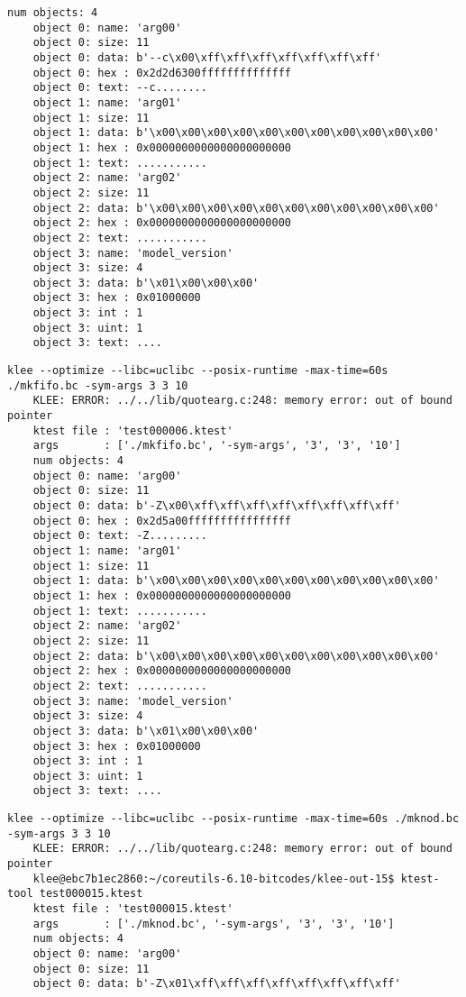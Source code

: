 \documentclass[12pt,letterpaper]{article}
\begin{document}
\begin{mdframed}
\begin{lstlisting}[basicstyle=\tiny]
    num objects: 4
    object 0: name: 'arg00'
    object 0: size: 11
    object 0: data: b'--c\x00\xff\xff\xff\xff\xff\xff\xff'
    object 0: hex : 0x2d2d6300ffffffffffffff
    object 0: text: --c........
    object 1: name: 'arg01'
    object 1: size: 11
    object 1: data: b'\x00\x00\x00\x00\x00\x00\x00\x00\x00\x00\x00'
    object 1: hex : 0x0000000000000000000000
    object 1: text: ...........
    object 2: name: 'arg02'
    object 2: size: 11
    object 2: data: b'\x00\x00\x00\x00\x00\x00\x00\x00\x00\x00\x00'
    object 2: hex : 0x0000000000000000000000
    object 2: text: ...........
    object 3: name: 'model_version'
    object 3: size: 4
    object 3: data: b'\x01\x00\x00\x00'
    object 3: hex : 0x01000000
    object 3: int : 1
    object 3: uint: 1
    object 3: text: ....
  \end{lstlisting}
  \begin{lstlisting}[basicstyle=\tiny]
    klee --optimize --libc=uclibc --posix-runtime -max-time=60s ./mkfifo.bc -sym-args 3 3 10
    KLEE: ERROR: ../../lib/quotearg.c:248: memory error: out of bound pointer
    ktest file : 'test000006.ktest'
    args       : ['./mkfifo.bc', '-sym-args', '3', '3', '10']
    num objects: 4
    object 0: name: 'arg00'
    object 0: size: 11
    object 0: data: b'-Z\x00\xff\xff\xff\xff\xff\xff\xff\xff'
    object 0: hex : 0x2d5a00ffffffffffffffff
    object 0: text: -Z.........
    object 1: name: 'arg01'
    object 1: size: 11
    object 1: data: b'\x00\x00\x00\x00\x00\x00\x00\x00\x00\x00\x00'
    object 1: hex : 0x0000000000000000000000
    object 1: text: ...........
    object 2: name: 'arg02'
    object 2: size: 11
    object 2: data: b'\x00\x00\x00\x00\x00\x00\x00\x00\x00\x00\x00'
    object 2: hex : 0x0000000000000000000000
    object 2: text: ...........
    object 3: name: 'model_version'
    object 3: size: 4
    object 3: data: b'\x01\x00\x00\x00'
    object 3: hex : 0x01000000
    object 3: int : 1
    object 3: uint: 1
    object 3: text: ....
  \end{lstlisting}
  \begin{lstlisting}[basicstyle=\tiny]
    klee --optimize --libc=uclibc --posix-runtime -max-time=60s ./mknod.bc -sym-args 3 3 10
    KLEE: ERROR: ../../lib/quotearg.c:248: memory error: out of bound pointer
    klee@ebc7b1ec2860:~/coreutils-6.10-bitcodes/klee-out-15$ ktest-tool test000015.ktest
    ktest file : 'test000015.ktest'
    args       : ['./mknod.bc', '-sym-args', '3', '3', '10']
    num objects: 4
    object 0: name: 'arg00'
    object 0: size: 11
    object 0: data: b'-Z\x01\xff\xff\xff\xff\xff\xff\xff\xff'

\end{lstlisting}
\end{mdframed}
\end{document}

